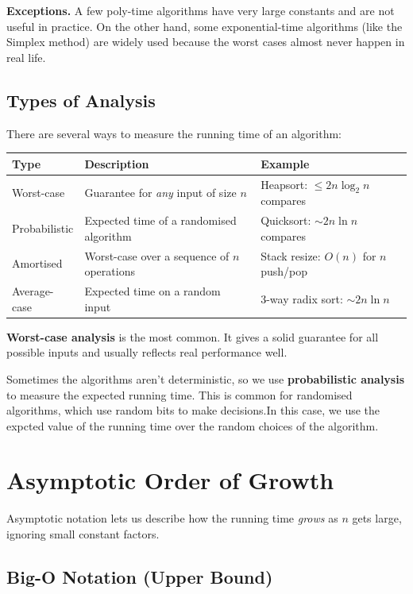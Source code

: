 \documentclass[12pt,a4paper]{report}
\begin{document}
\textbf{Exceptions.} A few poly-time algorithms have very large constants and are not
useful in practice. On the other hand, some exponential-time algorithms (like the Simplex
method) are widely used because the worst cases almost never happen in real life.

\subsection{Types of Analysis}

There are several ways to measure the running time of an algorithm:

\begin{center}
\begin{tabular}{@{}lll@{}}
\toprule
\textbf{Type} & \textbf{Description} & \textbf{Example} \\
\midrule
Worst-case   & Guarantee for \emph{any} input of size $n$ & Heapsort: $\leq 2n\log_2 n$ compares \\
Probabilistic & Expected time of a randomised algorithm   & Quicksort: $\sim 2n\ln n$ compares \\
Amortised    & Worst-case over a sequence of $n$ operations & Stack resize: $O(n)$ for $n$ push/pop \\
Average-case & Expected time on a random input           & 3-way radix sort: $\sim 2n\ln n$ \\
\bottomrule
\end{tabular}
\end{center}

\textbf{Worst-case analysis} is the most common. It gives a solid guarantee for all
possible inputs and usually reflects real performance well.

Sometimes the algorithms aren't deterministic, so we use \textbf{probabilistic analysis} to measure the expected running time. This is common for randomised algorithms, which use random bits to make decisions.In this case, we use the expcted value of the running time over the random choices of the algorithm.
\section{Asymptotic Order of Growth}

Asymptotic notation lets us describe how the running time \emph{grows} as $n$ gets large,
ignoring small constant factors.

\subsection{Big-O Notation (Upper Bound)}
\end{document}
